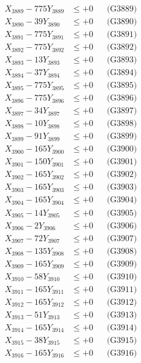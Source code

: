 \documentclass[a4paper,10pt]{article}
\begin{document}
{\begin{align}
X_{3889} - 775Y_{3889} &\leq +0 && \text{(G3889)} \\
X_{3890} - 39Y_{3890} &\leq +0 && \text{(G3890)} \\
\allowbreak
X_{3891} - 775Y_{3891} &\leq +0 && \text{(G3891)} \\
X_{3892} - 775Y_{3892} &\leq +0 && \text{(G3892)} \\
X_{3893} - 13Y_{3893} &\leq +0 && \text{(G3893)} \\
X_{3894} - 37Y_{3894} &\leq +0 && \text{(G3894)} \\
X_{3895} - 775Y_{3895} &\leq +0 && \text{(G3895)} \\
X_{3896} - 775Y_{3896} &\leq +0 && \text{(G3896)} \\
X_{3897} - 34Y_{3897} &\leq +0 && \text{(G3897)} \\
X_{3898} - 10Y_{3898} &\leq +0 && \text{(G3898)} \\
X_{3899} - 91Y_{3899} &\leq +0 && \text{(G3899)} \\
X_{3900} - 165Y_{3900} &\leq +0 && \text{(G3900)} \\
\allowbreak
X_{3901} - 150Y_{3901} &\leq +0 && \text{(G3901)} \\
X_{3902} - 165Y_{3902} &\leq +0 && \text{(G3902)} \\
X_{3903} - 165Y_{3903} &\leq +0 && \text{(G3903)} \\
X_{3904} - 165Y_{3904} &\leq +0 && \text{(G3904)} \\
X_{3905} - 14Y_{3905} &\leq +0 && \text{(G3905)} \\
X_{3906} - 2Y_{3906} &\leq +0 && \text{(G3906)} \\
X_{3907} - 72Y_{3907} &\leq +0 && \text{(G3907)} \\
X_{3908} - 135Y_{3908} &\leq +0 && \text{(G3908)} \\
X_{3909} - 165Y_{3909} &\leq +0 && \text{(G3909)} \\
X_{3910} - 58Y_{3910} &\leq +0 && \text{(G3910)} \\
\allowbreak
X_{3911} - 165Y_{3911} &\leq +0 && \text{(G3911)} \\
X_{3912} - 165Y_{3912} &\leq +0 && \text{(G3912)} \\
X_{3913} - 51Y_{3913} &\leq +0 && \text{(G3913)} \\
X_{3914} - 165Y_{3914} &\leq +0 && \text{(G3914)} \\
X_{3915} - 38Y_{3915} &\leq +0 && \text{(G3915)} \\
X_{3916} - 165Y_{3916} &\leq +0 && \text{(G3916)} \\

\end{align}}
\end{document}
